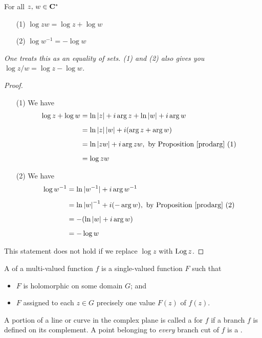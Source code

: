 \begin{proposition}
For all $z,\, w\in \mathbf C^*$
\begin{multicols}{2}
\begin{itemize}
\item[(1)] $\log zw = \log z + \log w$
\item[(2)] $\log w^{-1} = -\log w$
\end{itemize}
\end{multicols}
\emph{One treats this as an equality of sets. (1) and (2) also gives you $\log z/w = \log z - \log w$.}
\end{proposition}
\begin{proof}\hfill
\begin{itemize}
\item[(1)] We have
\begin{align*}
\log z + \log w &= \ln\left\lvert z\right\rvert + i\arg z + \ln\left\lvert w\right\rvert + i\arg w\\[0.5em]
&= \ln\left\lvert z\right\rvert\left\lvert w\right\rvert + i(\arg z + \arg w)\\[0.5em]
&= \ln\left\lvert zw\right\rvert + i\arg zw,\ \text{by Proposition \ref{prodarg} (1)}\\[0.5em]
&= \log zw
\end{align*}
\item[(2)] We have
\begin{align*}
\log w^{-1} &= \ln|w^{-1}| + i\arg w^{-1}\\[0.5em]
&= \ln\left\lvert w\right\rvert^{-1} + i(-\arg w),\ \text{by Proposition \ref{prodarg} (2)}\\[0.5em]
&= -(\ln\left\lvert w\right\rvert + i\arg w)\\[0.5em]
&= -\log w
\end{align*}
\end{itemize}
This statement does not hold if we replace $\log z$ with $\operatorname{Log} z$.
\end{proof}


\begin{definition}
A  of a multi-valued function $f$ is a single-valued function $F$ such that
\begin{itemize}
\item $F$ is holomorphic on some domain $G$; and
\item $F$ assigned to each $z\in G$ precisely one value $F(z)$ of $f(z)$.
\end{itemize}
A portion of a line or curve in the complex plane is called a  for $f$ if a branch $f$ is defined on its complement. A point belonging to \emph{every} branch cut of $f$ is a .
\end{definition}


